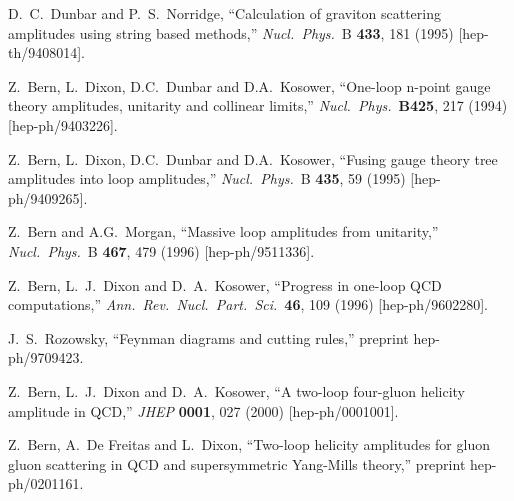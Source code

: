 \documentclass[12pt]{livrev}
\begin{document}
\begin{thebibliography}{99}
D.~C.~Dunbar and P.~S.~Norridge,
``Calculation of graviton scattering amplitudes using string based methods,''
{\it Nucl.\ Phys.}\ B {\bf 433}, 181 (1995)
[hep-th/9408014].

Z.~Bern, L.~Dixon, D.C.~Dunbar and D.A.~Kosower,
``One-loop n-point gauge theory amplitudes, unitarity 
and collinear limits,''
{\it Nucl.\ Phys.}\ {\bf B425}, 217 (1994)
[hep-ph/9403226].

Z.~Bern, L.~Dixon, D.C.~Dunbar and D.A.~Kosower,
``Fusing gauge theory tree amplitudes into loop amplitudes,''
{\it Nucl.\ Phys.}\ B {\bf 435}, 59 (1995)
[hep-ph/9409265].

Z.~Bern and A.G.~Morgan,
``Massive loop amplitudes from unitarity,''
{\it Nucl.\ Phys.}\ B {\bf 467}, 479 (1996)
[hep-ph/9511336].

Z.~Bern, L.~J.~Dixon and D.~A.~Kosower,
``Progress in one-loop QCD computations,''
{\it Ann.\ Rev.\ Nucl.\ Part.\ Sci.}\  {\bf 46}, 109 (1996)
[hep-ph/9602280].

J.~S.~Rozowsky,
``Feynman diagrams and cutting rules,''
preprint hep-ph/9709423.

Z.~Bern, L.~J.~Dixon and D.~A.~Kosower,
``A two-loop four-gluon helicity amplitude in QCD,''
{\it JHEP} {\bf 0001}, 027 (2000)
[hep-ph/0001001].

Z.~Bern, A.~De Freitas and L.~Dixon,
``Two-loop helicity amplitudes for gluon gluon scattering in QCD and 
supersymmetric Yang-Mills theory,''
preprint hep-ph/0201161.


\end{thebibliography}
\end{document}
